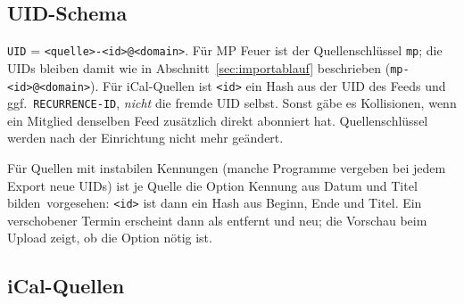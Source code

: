 \documentclass[a4paper,fontsize=10pt]{scrartcl}
\newcommand{\code}[1]{\texttt{#1}}
\begin{document}
\subsection{UID-Schema}\label{sec:quellen-uid}

\code{UID} = \code{<quelle>-<id>@<domain>}. Für MP Feuer ist der
Quellenschlüssel \code{mp}; die UIDs bleiben damit wie in
Abschnitt~\ref{sec:importablauf} beschrieben (\code{mp-<id>@<domain>}). Für
iCal-Quellen ist \code{<id>} ein Hash aus der UID des Feeds und ggf.\
\code{RECURRENCE-ID}, \emph{nicht} die fremde UID selbst. Sonst gäbe es
Kollisionen, wenn ein Mitglied denselben Feed zusätzlich direkt abonniert
hat. Quellenschlüssel werden nach der Einrichtung nicht mehr geändert.

Für Quellen mit instabilen Kennungen (manche Programme vergeben bei jedem
Export neue UIDs) ist je Quelle die Option \glqq Kennung aus Datum und Titel
bilden\grqq\ vorgesehen: \code{<id>} ist dann ein Hash aus Beginn, Ende
und Titel. Ein verschobener Termin erscheint dann als entfernt und neu; die
Vorschau beim Upload zeigt, ob die Option nötig ist.

\subsection{iCal-Quellen}
\end{document}
